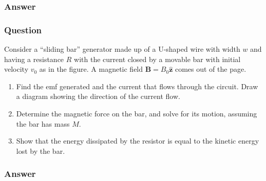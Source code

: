 \subsubsection{Answer}

\subsubsection{Question}
Consider a ``sliding bar'' generator made up of a U-shaped wire with width $w$ and having a resistance $R$ with the current closed by a movable bar with initial velocity $v_0$ as in the figure. A magnetic field $\mathbf{B} = B_0\hat{\boldsymbol{z}}$ comes out of the page.
\begin{enumerate}
	\item Find the emf generated and the current that flows through the circuit. Draw a diagram showing the direction of the current flow.
	\item Determine the magnetic force on the bar, and solve for its motion, assuming the bar has mass $M.$
	\item Show that the energy dissipated by the resistor is equal to the kinetic energy lost by the bar. 
\end{enumerate}
\subsubsection{Answer}



